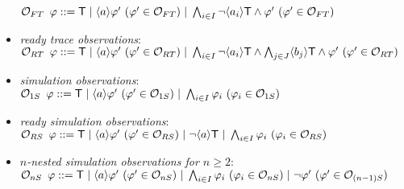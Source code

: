 \documentclass{eptcs}
\def\hmo{{\cal O}}
\def\true{{\sf T}}
\newcommand{\diam}[1]{\langle#1\rangle}
\begin{document}
\begin{itemize}
	$\hmo_{FT} \hspace{5.0 pt} \varphi ::= \true \hspace{3.0 pt}|\hspace{3.0 pt} \diam{a} \varphi '~(\varphi' \in \hmo_{FT})\hspace{3.0 pt}|\hspace{3.0 pt} \bigwedge_{i \in I} \neg \diam{a_i} \true \wedge \varphi '~(\varphi ' \in \hmo_{FT})$
	\item \textit{ready trace observations}:\\	
	$\hmo_{RT} \hspace{5.0 pt} \varphi ::= \true \hspace{3.0 pt}|\hspace{3.0 pt} \diam{a} \varphi '~(\varphi' \in \hmo_{RT})\hspace{3.0 pt}|\hspace{3.0 pt} \bigwedge_{i \in I} \neg \diam{a_i} \true \wedge \bigwedge_{j \in J} \diam{b_j} \true \wedge \varphi '~(\varphi ' \in \hmo_{RT})$
	\item \textit{simulation observations}:\\	
	$\hmo_{1S} \hspace{5.0 pt} \varphi ::= \true \hspace{3.0 pt}|\hspace{3.0 pt} \diam{a} \varphi '~(\varphi' \in \hmo_{1S}) \hspace{3.0 pt}|\hspace{3.0 pt} \bigwedge_{i \in I} \varphi_{i}~(\varphi_{i} \in \hmo_{1S})$
	\item \textit{ready simulation observations}:\\	 
	$\hmo_{RS} \hspace{5.0 pt} \varphi ::= \true \hspace{3.0 pt}|\hspace{3.0 pt} \diam{a} \varphi '~(\varphi' \in \hmo_{RS}) \hspace{3.0 pt}|\hspace{3.0 pt} \neg \diam{a} \true \hspace{3.0 pt}|\hspace{3.0 pt} \bigwedge_{i \in I} \varphi_{i}~(\varphi_{i} \in \hmo_{RS})$
	\item \textit{$n$-nested simulation observations for $n \geq 2$}:\\	 
	$\hmo_{nS} \hspace{5.0 pt} \varphi ::= \true \hspace{3.0 pt}|\hspace{3.0 pt} \diam{a} \varphi '~(\varphi' \in \hmo_{nS}) \hspace{3.0 pt}|\hspace{3.0 pt} \bigwedge_{i \in I} \varphi_{i}~(\varphi_{i} \in \hmo_{nS}) \hspace{3.0 pt}|\hspace{3.0 pt} \neg \varphi '~(\varphi' \in \hmo_{(n-1)S})$

\end{itemize}
\end{document}
